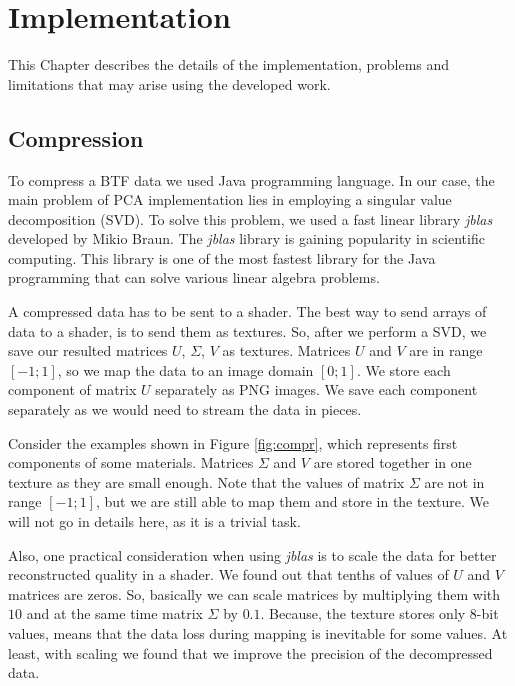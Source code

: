 \chapter{Implementation}

This Chapter describes the details of the implementation, problems and limitations that may arise using the developed work.



\section{Compression}
\label{section:impl_compression}

To compress a BTF data we used Java programming language. In our case, the main problem of PCA implementation lies in employing a singular value decomposition (SVD).
To solve this problem, we used a fast linear library \emph{jblas} \cite{jblas} developed by Mikio Braun. The \emph{jblas} library is gaining popularity in scientific computing.
This library is one of the most fastest library for the Java programming that can solve various linear algebra problems. 

A compressed data has to be sent to a shader. The best way to send arrays of data to a shader, is to send them as textures. 
So, after we perform a SVD, we save our resulted matrices $U$, $\Sigma$, $V$ as textures.  Matrices $U$ and $V$ are in range $[-1;1]$, so we map the data to an image domain $[0;1]$.
We store each component of matrix $U$ separately as PNG images. We save each component separately as we would need to stream the data in pieces.

Consider the examples shown in Figure \ref{fig:compr}, which represents first components of some materials.
Matrices $\Sigma$ and $V$ are stored together in one texture as they are small enough. Note that the values of matrix $\Sigma$ are not in range $[-1;1]$, but we are still able to map them and store in the texture.
We will not go in details here, as it is a trivial task.

Also, one practical consideration when using \emph{jblas} is to scale the data for better reconstructed quality in a shader. We found out that tenths of values of $U$ and $V$ matrices are zeros.
So, basically we can scale matrices by multiplying them with $10$ and at the same time matrix $\Sigma$ by $0.1$. 
Because, the texture stores only 8-bit values, means that the data loss during mapping is inevitable for some values. 
At least, with scaling we found that we improve the precision of the decompressed data.




